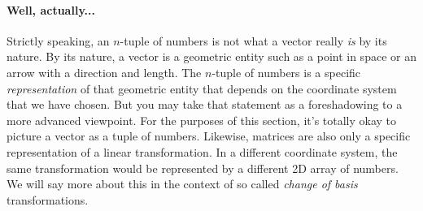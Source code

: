 







\paragraph{Well, actually...}
Strictly speaking, an $n$-tuple of numbers is not what a vector really \emph{is} by its nature. By its nature, a vector is a geometric entity such as a point in space or an arrow with a direction and length. The $n$-tuple of numbers is a specific \emph{representation} of that geometric entity that depends on the coordinate system that we have chosen. But you may take that statement as a foreshadowing to a more advanced viewpoint. For the purposes of this section, it's totally okay to picture a vector as a tuple of numbers. Likewise, matrices are also only a specific representation of a linear transformation. In a different coordinate system, the same transformation would be represented by a different 2D array of numbers. We will say more about this in the context of so called \emph{change of basis} transformations.

